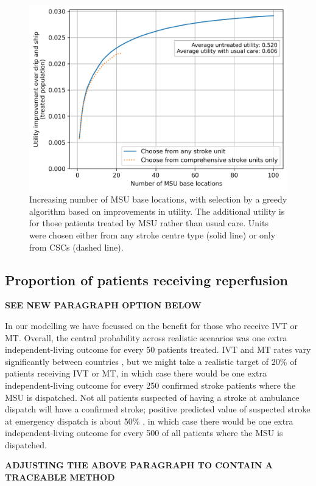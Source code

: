 \begin{figure}[h]
    \centering
    \includegraphics[width=0.5\linewidth]{images/msu_advantages_greedy.png}
    \caption{Increasing number of MSU base locations, with selection by a greedy algorithm based on improvements in utility. The additional utility is for those patients treated by MSU rather than usual care. Units were chosen either from any stroke centre type (solid line) or only from CSCs (dashed line).}
    \label{fig:greedy}
\end{figure}

\subsection{Proportion of patients receiving reperfusion}

\textbf{SEE NEW PARAGRAPH OPTION BELOW}

In our modelling we have focussed on the benefit for those who receive IVT or MT. Overall, the central probability across realistic scenarios was one extra independent-living outcome for every 50 patients treated. IVT and MT rates vary significantly between countries \cite{kim_global_2024}, but we might take a realistic target of 20\% of patients receiving IVT or MT, in which case there would be one extra independent-living outcome for every 250 confirmed stroke patients where the MSU is dispatched. Not all patients suspected of having a stroke at ambulance dispatch will have a confirmed stroke; positive predicted value of suspected stroke at emergency dispatch is about 50\% \cite{wenstrup_emergency_2024}, in which case there would be one extra independent-living outcome for every 500 of all patients where the MSU is dispatched.

\textbf{ADJUSTING THE ABOVE PARAGRAPH TO CONTAIN A TRACEABLE METHOD}

